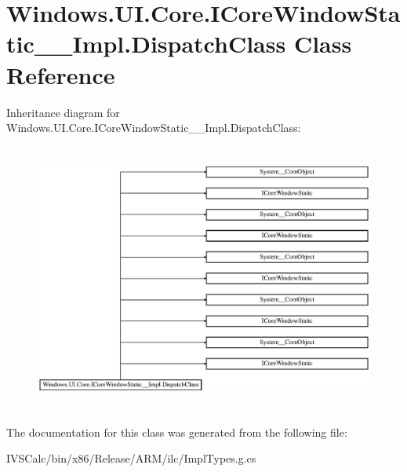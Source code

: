 \hypertarget{class_windows_1_1_u_i_1_1_core_1_1_i_core_window_static_____impl_1_1_dispatch_class}{}\section{Windows.\+U\+I.\+Core.\+I\+Core\+Window\+Static\+\_\+\+\_\+\+Impl.\+Dispatch\+Class Class Reference}
\label{class_windows_1_1_u_i_1_1_core_1_1_i_core_window_static_____impl_1_1_dispatch_class}
Inheritance diagram for Windows.\+U\+I.\+Core.\+I\+Core\+Window\+Static\+\_\+\+\_\+\+Impl.\+Dispatch\+Class\+:\begin{figure}[H]
\begin{center}
\leavevmode
\includegraphics[height=8.876081cm]{class_windows_1_1_u_i_1_1_core_1_1_i_core_window_static_____impl_1_1_dispatch_class}
\end{center}
\end{figure}


The documentation for this class was generated from the following file\+:\begin{DoxyCompactItemize}
\item 
I\+V\+S\+Calc/bin/x86/\+Release/\+A\+R\+M/ilc/Impl\+Types.\+g.\+cs\end{DoxyCompactItemize}
